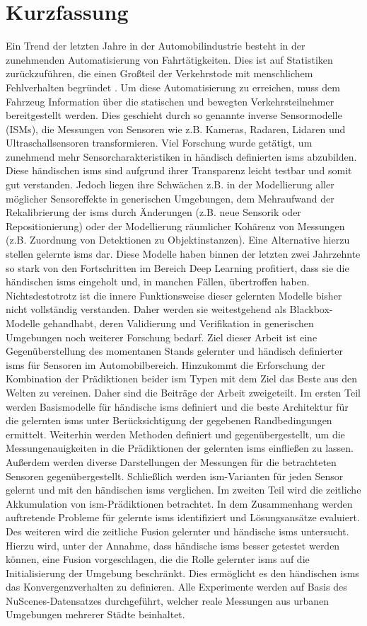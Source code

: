 \section*{Kurzfassung}
Ein Trend der letzten Jahre in der Automobilindustrie besteht in der zunehmenden Automatisierung von Fahrtätigkeiten. Dies ist auf Statistiken zurückzuführen, die einen Gro{\ss}teil der Verkehrstode mit menschlichem Fehlverhalten begründet \cite{world2018global}. Um diese Automatisierung zu erreichen, muss dem Fahrzeug Information über die statischen und bewegten Verkehrsteilnehmer bereitgestellt werden. Dies geschieht durch so genannte inverse Sensormodelle (ISMs), die Messungen von Sensoren wie z.B. Kameras, Radaren, Lidaren und Ultraschallsensoren transformieren. Viel Forschung wurde getätigt, um zunehmend mehr Sensorcharakteristiken in händisch definierten \gls{ism}s abzubilden. Diese händischen \gls{ism}s sind aufgrund ihrer Transparenz leicht testbar und somit gut verstanden. Jedoch liegen ihre Schwächen z.B. in der Modellierung aller möglicher Sensoreffekte in generischen Umgebungen, dem Mehraufwand der Rekalibrierung der \gls{ism}s durch Änderungen (z.B. neue Sensorik oder Repositionierung) oder der Modellierung räumlicher Kohärenz von Messungen (z.B. Zuordnung von Detektionen zu Objektinstanzen). Eine Alternative hierzu stellen gelernte \gls{ism}s dar. Diese Modelle haben binnen der letzten zwei Jahrzehnte so stark von den Fortschritten im Bereich Deep Learning profitiert, dass sie die händischen \gls{ism}s eingeholt und, in manchen Fällen, übertroffen haben. Nichtsdestotrotz ist die innere Funktionsweise dieser gelernten Modelle bisher nicht vollständig verstanden. Daher werden sie weitestgehend als Blackbox-Modelle gehandhabt, deren Validierung und Verifikation in generischen Umgebungen noch weiterer Forschung bedarf. Ziel dieser Arbeit ist eine Gegenüberstellung des momentanen Stands gelernter und händisch definierter \gls{ism}s für Sensoren im Automobilbereich. Hinzukommt die Erforschung der Kombination der Prädiktionen beider \gls{ism} Typen mit dem Ziel das Beste aus den Welten zu vereinen. Daher sind die Beiträge der Arbeit zweigeteilt. Im ersten Teil werden Basismodelle für händische \gls{ism}s definiert und die beste Architektur für die gelernten \gls{ism}s unter Berücksichtigung der gegebenen Randbedingungen ermittelt. Weiterhin werden Methoden definiert und gegenübergestellt, um die Messungenauigkeiten in die Prädiktionen der gelernten \gls{ism}s einflie{\ss}en zu lassen. Au{\ss}erdem werden diverse Darstellungen der Messungen für die betrachteten Sensoren gegenübergestellt. Schlie{\ss}lich werden \gls{ism}-Varianten für jeden Sensor gelernt und mit den händischen \gls{ism}s verglichen. Im zweiten Teil wird die zeitliche Akkumulation von \gls{ism}-Prädiktionen betrachtet. In dem Zusammenhang werden auftretende Probleme für gelernte \gls{ism}s identifiziert und Lösungsansätze evaluiert. Des weiteren wird die zeitliche Fusion gelernter und händische \gls{ism}s untersucht. Hierzu wird, unter der Annahme, dass händische \gls{ism}s besser getestet werden können, eine Fusion vorgeschlagen, die die Rolle gelernter \gls{ism}s auf die Initialisierung der Umgebung beschränkt. Dies ermöglicht es den händischen \gls{ism}s das Konvergenzverhalten zu definieren. Alle Experimente werden auf Basis des NuScenes-Datensatzes \cite{caesar2020nuscenes} durchgeführt, welcher reale Messungen aus urbanen Umgebungen mehrerer Städte beinhaltet.